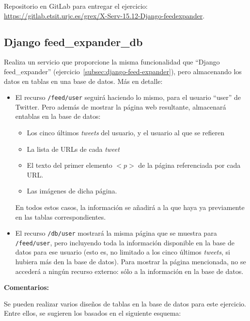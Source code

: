 Repositorio en GitLab para entregar el ejercicio: \\ 
\url{https://gitlab.etsit.urjc.es/grex/X-Serv-15.12-Django-feedexpander}.


\subsection{Django feed\_expander\_db}
\label{subsec:django-feed-expander-db}

Realiza un servicio que proporcione la misma funcionalidad que ``Django feed\_expander'' (ejercicio~\ref{subsec:django-feed-expander}), pero almacenando los datos en tablas en una base de datos. Más en detalle:

\begin{itemize}
\item El recurso \verb|/feed/user| seguirá haciendo lo mismo, para el usuario ``user'' de Twitter. Pero además de mostrar la página web resultante, almacenará entablas en la base de datos:

  \begin{itemize}
  \item Los cinco últimos \emph{tweets} del usuario, y el usuario al que se refieren
  \item La lista de URLs de cada \emph{tweet}
  \item El texto del primer elemento $<p>$ de la página referenciada por cada URL.
  \item Las imágenes de dicha página.
  \end{itemize}

En todos estos casos, la información se añadirá a la que haya ya previamente en las tablas correspondientes.

\item El recurso \verb|/db/user| mostrará la misma página que se muestra para \verb|/feed/user|, pero incluyendo toda la información disponible en la base de datos para ese usuario (esto es, no limitado a los cinco últimos \emph{tweets}, si hubiera más den la base de datos). Para mostrar la página mencionada, no se accederá a ningún recurso externo: sólo a la información en la base de datos.
\end{itemize}

\textbf{Comentarios:}

Se pueden realizar varios diseños de tablas en la base de datos para este ejercicio. Entre ellos, se sugieren los basados en el siguiente esquema:

